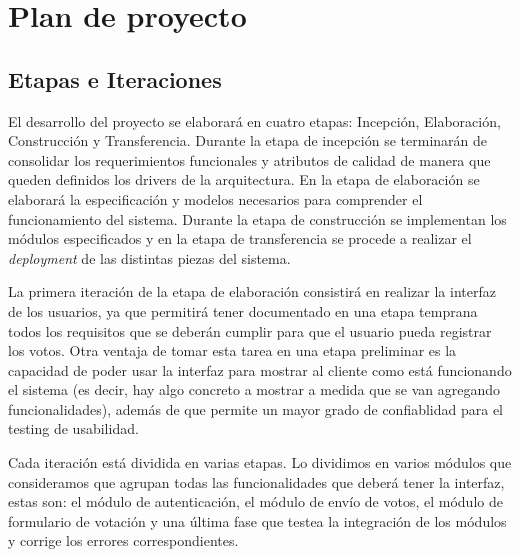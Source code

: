 \section{Plan de proyecto}

\subsection{Etapas e Iteraciones}

El desarrollo del proyecto se elaborar\'a en cuatro etapas: Incepción, Elaboración, Construcción y Transferencia. Durante la etapa de incepción se terminar\'an de consolidar los requerimientos funcionales y atributos de calidad de manera que queden definidos los drivers de la arquitectura. En la etapa de elaboración se elaborar\'a la especificación y modelos necesarios para comprender el funcionamiento del sistema. Durante la etapa de construcción se implementan los m\'odulos especificados y en la etapa de transferencia se procede a realizar el \textit{deployment} de las distintas piezas del sistema.  
\\ \par

La primera iteración de la etapa de elaboración consistirá en realizar la interfaz de los usuarios, ya que permitirá tener documentado en una etapa temprana todos los requisitos que se deber\'an cumplir para que el usuario pueda registrar los votos. Otra ventaja de tomar esta tarea en una etapa preliminar es la capacidad de poder usar la interfaz para mostrar al cliente como está funcionando el sistema (es decir, hay algo concreto a mostrar a medida que se van agregando funcionalidades), además de que permite un mayor grado de confiablidad para el testing de usabilidad. 
\\ \par
Cada iteración está dividida en varias etapas. Lo dividimos en varios m\'odulos que consideramos que agrupan todas las funcionalidades que deber\'a tener la interfaz, estas son: el m\'odulo de autenticación, el m\'odulo de envío de votos, el m\'odulo de formulario de votaci\'on y una \'ultima fase que testea la integraci\'on de los m\'odulos y corrige los errores correspondientes.

